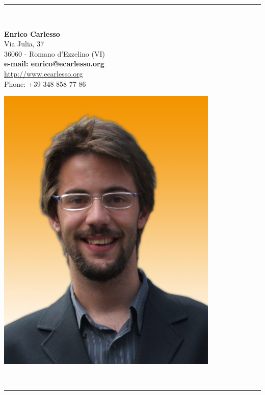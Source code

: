 \documentclass[pdftex, a4paper, 11pt]{article}
\begin{document}
\vspace*{.3cm}
\begin{center}
  \rule{.8\textwidth}{1pt}\\[10pt]
  \begin{minipage}{.55\textwidth}
    \LARGE\textbf{Enrico Carlesso}\\[13pt]
    \small Via Julia, 37\\
    36060 - Romano d'Ezzelino (VI)\\[6pt]
    \textbf{e-mail: enrico@ecarlesso.org}\\
    \small \url{http://www.ecarlesso.org}\\
    \small Phone: +39 348 858 77 86\\[6pt]
  \end{minipage}
  \begin{minipage}{.2\textwidth}
    \includegraphics[width=\textwidth]{foto.png}
  \end{minipage}\\[5pt]
  \rule{.8\textwidth}{1pt}
\end{center}
\vspace*{1cm}
\end{document}
